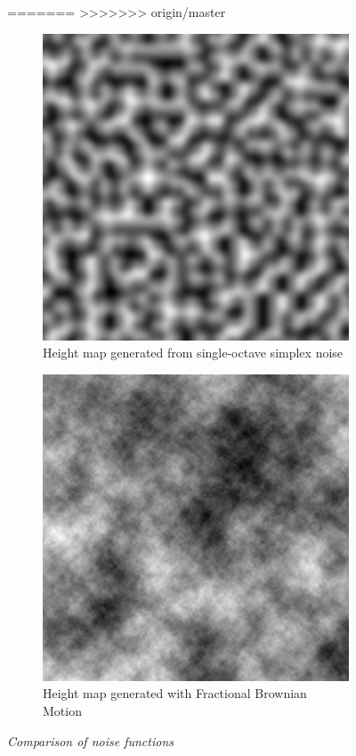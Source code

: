 \begin{figure}[H]
=======
>>>>>>> origin/master
\begin{subfigure}{.5\textwidth}
  \centering
  \includegraphics[width=0.9\linewidth]{images/Simplex.png}
  \caption{Height map generated from single-octave simplex noise}
  \label{fig:sub1}
\end{subfigure}%
\begin{subfigure}{.5\textwidth}
  \centering
  \includegraphics[width=0.9\linewidth]{images/FracBrownMotion.png}
  \caption{Height map generated with Fractional Brownian Motion}
  \label{fig:sub2}
\end{subfigure}
\caption[Noise comparison]{\textit{Comparison of noise functions}}
\label{fig:R_kitchen_example}
\end{figure}

